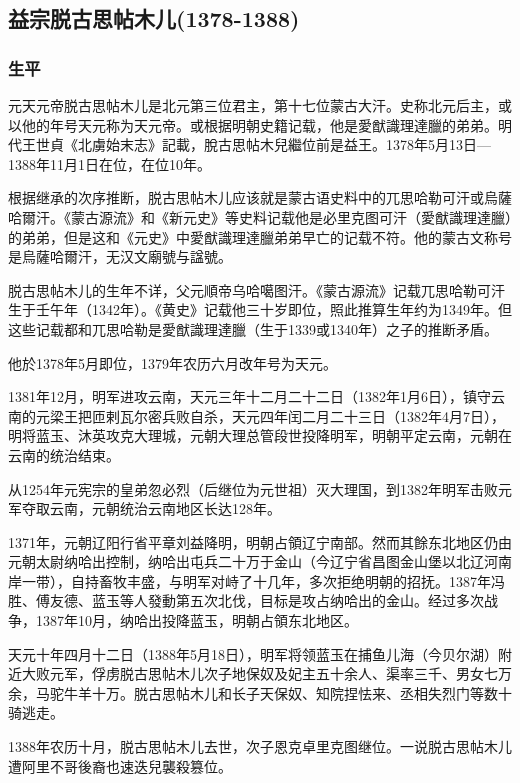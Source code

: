\subsection{益宗脱古思帖木儿\tiny(1378-1388)}

\subsubsection{生平}

元天元帝脱古思帖木儿是北元第三位君主，第十七位蒙古大汗。史称北元后主，或以他的年号天元称为天元帝。或根据明朝史籍记载，他是愛猷識理達臘的弟弟。明代王世貞《北虜始末志》記載，脫古思帖木兒繼位前是益王。1378年5月13日—1388年11月1日在位，在位10年。

根据继承的次序推断，脱古思帖木儿应该就是蒙古语史料中的兀思哈勒可汗或烏薩哈爾汗。《蒙古源流》和《新元史》等史料记载他是必里克图可汗（愛猷識理達臘）的弟弟，但是这和《元史》中愛猷識理達臘弟弟早亡的记载不符。他的蒙古文称号是烏薩哈爾汗，无汉文廟號与諡號。

脱古思帖木儿的生年不详，父元順帝乌哈噶图汗。《蒙古源流》记载兀思哈勒可汗生于壬午年（1342年）。《黄史》记载他三十岁即位，照此推算生年约为1349年。但这些记载都和兀思哈勒是愛猷識理達臘（生于1339或1340年）之子的推断矛盾。

他於1378年5月即位，1379年农历六月改年号为天元。

1381年12月，明军进攻云南，天元三年十二月二十二日（1382年1月6日），镇守云南的元梁王把匝剌瓦尔密兵败自杀，天元四年闰二月二十三日（1382年4月7日），明将蓝玉、沐英攻克大理城，元朝大理总管段世投降明军，明朝平定云南，元朝在云南的统治结束。

从1254年元宪宗的皇弟忽必烈（后继位为元世祖）灭大理国，到1382年明军击败元军夺取云南，元朝统治云南地区长达128年。

1371年，元朝辽阳行省平章刘益降明，明朝占領辽宁南部。然而其餘东北地区仍由元朝太尉纳哈出控制，纳哈出屯兵二十万于金山（今辽宁省昌图金山堡以北辽河南岸一带），自持畜牧丰盛，与明军对峙了十几年，多次拒绝明朝的招抚。1387年冯胜、傅友德、蓝玉等人發動第五次北伐，目标是攻占纳哈出的金山。经过多次战争，1387年10月，纳哈出投降蓝玉，明朝占領东北地区。

天元十年四月十二日（1388年5月18日），明军将领蓝玉在捕鱼儿海（今贝尔湖）附近大败元军，俘虏脱古思帖木儿次子地保奴及妃主五十余人、渠率三千、男女七万余，马驼牛羊十万。脱古思帖木儿和长子天保奴、知院捏怯来、丞相失烈门等数十骑逃走。

1388年农历十月，脱古思帖木儿去世，次子恩克卓里克图继位。一说脱古思帖木儿遭阿里不哥後裔也速迭兒襲殺篡位。

